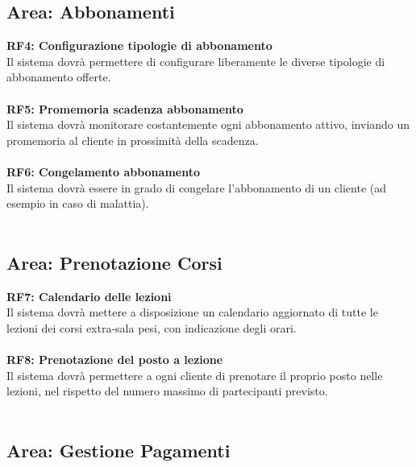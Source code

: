 \documentclass[12pt,a4paper]{report}
\begin{document}
\subsection{Area: Abbonamenti}

\noindent\textbf{RF4: Configurazione tipologie di abbonamento}\\
Il sistema dovrà permettere di configurare liberamente le diverse tipologie di abbonamento offerte.\\
\\
\noindent\textbf{RF5: Promemoria scadenza abbonamento}\\
Il sistema dovrà monitorare costantemente ogni abbonamento attivo, inviando un promemoria al cliente in prossimità della scadenza.\\
\\
\noindent\textbf{RF6: Congelamento abbonamento}\\
Il sistema dovrà essere in grado di congelare l'abbonamento di un cliente (ad esempio in caso di malattia).\\
\\
\subsection{Area: Prenotazione Corsi}

\noindent\textbf{RF7: Calendario delle lezioni}\\
Il sistema dovrà mettere a disposizione un calendario aggiornato di tutte le lezioni dei corsi extra-sala pesi, con indicazione degli orari.\\
\\
\noindent\textbf{RF8: Prenotazione del posto a lezione}\\
Il sistema dovrà permettere a ogni cliente di prenotare il proprio posto nelle lezioni, nel rispetto del numero massimo di partecipanti previsto.\\
\\
\subsection{Area: Gestione Pagamenti}
\end{document}
